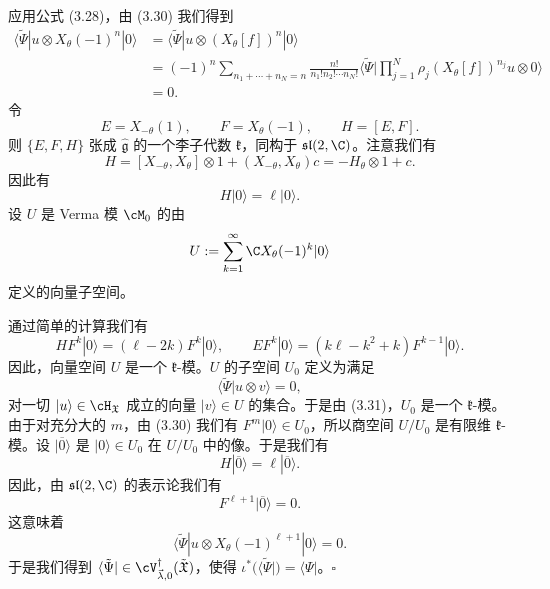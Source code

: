 
应用公式 (3.28)，由 (3.30) 我们得到
\begin{equation}
\begin{aligned}
\langle\tilde\Psi|u\otimes X_\theta(-1)^{n}|0\rangle
&=\langle\tilde\Psi|u\otimes(X_\theta[f])^{n}|0\rangle\\
&=(-1)^{n}\sum_{n_1+\cdots+n_N=n}
\frac{n!}{n_1!n_2!\cdots n_N!}
\langle\tilde\Psi|\prod_{j=1}^{N}\rho_j(X_\theta[f])^{n_j}u\otimes0\rangle\\
&=0.
\end{aligned}\tag{3.31}
\end{equation}
令
\[
E=X_{-\theta}(1),\qquad F=X_\theta(-1),\qquad H=[E,F].
\]
则 $\{E,F,H\}$ 张成 $\hat{\mathfrak{g}}$ 的一个李子代数 $\mathfrak{k}$，同构于 $\mathfrak{sl}(2,\C)$。注意我们有
\[
H=[X_{-\theta},X_\theta]\otimes1+(X_{-\theta},X_\theta)c=-H_\theta\otimes1+c.
\]
因此有
\[
H|0\rangle=\ell|0\rangle.
\]
设 $U$ 是 Verma 模 $\cM_0$ 的由
\[
U:=\sum_{k=1}^{\infty}\C X_\theta(-1)^{k}|0\rangle
\]
定义的向量子空间。

通过简单的计算我们有
\[
HF^{k}|0\rangle=(\ell-2k)F^{k}|0\rangle,\qquad
EF^{k}|0\rangle=(k\ell-k^{2}+k)F^{k-1}|0\rangle.
\]
因此，向量空间 $U$ 是一个 $\mathfrak{k}$-模。$U$ 的子空间 $U_0$ 定义为满足
\[
\langle\tilde\Psi|u\otimes v\rangle=0,
\]
对一切 $|u\rangle\in\cH_{\mathfrak{X}}$ 成立的向量 $|v\rangle\in U$ 的集合。于是由 (3.31)，$U_0$ 是一个 $\mathfrak{k}$-模。由于对充分大的 $m$，由 (3.30) 我们有 $F^{m}|0\rangle\in U_0$，所以商空间 $U/U_0$ 是有限维 $\mathfrak{k}$-模。设 $|\overline{0}\rangle$ 是 $|0\rangle\in U_0$ 在 $U/U_0$ 中的像。于是我们有
\[
H|\overline{0}\rangle=\ell|\overline{0}\rangle.
\]
因此，由 $\mathfrak{sl}(2,\C)$ 的表示论我们有
\[
F^{\ell+1}|\overline{0}\rangle=0.
\]
这意味着
\[
\langle\tilde\Psi|u\otimes X_\theta(-1)^{\ell+1}|0\rangle=0.
\]
于是我们得到 $\langle\tilde\Psi|\in\cV^{\dagger}_{\vec{\lambda},0}(\tilde{\mathfrak{X}})$，使得 $\iota^*(\langle\tilde\Psi|)=\langle\Psi|$。\hfill$\square$

